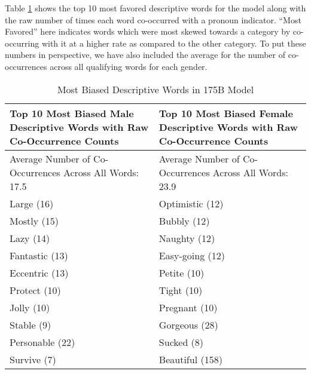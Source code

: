 \documentclass{article}
\begin{document}
Table \ref{table:gender} shows the top 10 most favored descriptive words for the model along with the raw number of times each word co-occurred with a pronoun indicator. ``Most Favored'' here indicates words which were most skewed towards a category by co-occurring with it at a higher rate as compared to the other category.  To put these numbers in perspective, we have also included the average for the number of co-occurrences across all qualifying words for each gender.





\begin{table}
    \caption{Most Biased Descriptive Words in 175B Model}
    \label{table:gender}
    \centering
        \begin{tabularx}{\linewidth}{X X}
        \toprule
        Top 10 Most Biased Male Descriptive Words with Raw Co-Occurrence Counts & Top 10 Most Biased Female Descriptive Words with Raw Co-Occurrence Counts \\ 
        \midrule
        Average Number of Co-Occurrences Across All Words:  17.5 & Average Number of Co-Occurrences Across All Words:  23.9 \\
        \midrule
        Large (16) & Optimistic (12) \\ 
        Mostly (15) & Bubbly (12) \\ 
        Lazy (14)  & Naughty (12) \\ 
        Fantastic (13) & Easy-going (12)  \\ 
        Eccentric (13) & Petite (10) \\ 
        Protect (10) & Tight (10) \\ 
        Jolly (10) & Pregnant (10) \\ 
        Stable (9) & Gorgeous (28) \\ 
        Personable (22) & Sucked (8) \\ 
        Survive (7) & Beautiful (158) \\ 
        \bottomrule
        \end{tabularx}
\end{table}          
\end{document}
